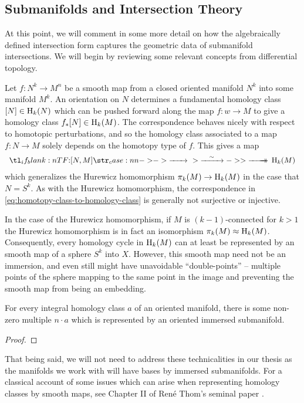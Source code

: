\subsection{Submanifolds and Intersection Theory}\label{sec:submanifolds-intersection-theory}

At this point, we will comment in some more detail on how the algebraically defined intersection form captures the geometric data of submanifold intersections. We will begin by reviewing some relevant concepts from differential topology.

Let $f : N^k\to M^n$ be a smooth map from a closed oriented manifold $N^k$ into some manifold $M^k$. An orientation on $N$ determines a fundamental homology class $[N]\in \operatorname{H}_k(N)$ which can be pushed forward along the map $f : w \to M$ to give a homology class $f_* [N]\in \operatorname{H}_k(M)$. 
The correspondence behaves nicely with respect to homotopic perturbations, and so
the homology class associated to a map $f : N \to M$ solely depends on the homotopy type of $f$. This gives a map
\begin{equation}\label{eq:homotopy-class-to-homology-class}
	\lkxfunc{}{[N,M]}{\H_k(M)}
\end{equation}
which generalizes the Hurewicz homomorphism $\pi_k(M) \to \operatorname{H}_k(M)$ in the case that $N=S^k$.
As with the Hurewicz homomorphism, the correspondence in \cref{eq:homotopy-class-to-homology-class} is generally not surjective or injective. 

In the case of the Hurewicz homomorphism, if $M$ is $(k-1)$-connected for $k > 1$ the Hurewicz homomorphism is in fact an isomorphism $\pi_{k}(M) \approx \operatorname{H}_{k}(M)$. Consequently, every homology cycle in $\operatorname{H}_{k}(M)$ can at least be represented by an smooth map of a sphere $S^{k}$ into $X$. However, this smooth map need not be an immersion, and even still might have unavoidable ``double-points'' -- multiple points of the sphere mapping to the same point in the image and preventing the smooth map from being an embedding.

\begin{theorem}[Thom]
	For every integral homology class $a$ of an oriented manifold, there is some non-zero multiple $n\cdot a$ which is represented by an oriented immersed submanifold.
\end{theorem}
\begin{proof}
\end{proof}

That being said, we will not need to address these technicalities in our thesis as the manifolds we work with will have bases by immersed submanifolds. For a classical account of some issues which can arise when representing homology classes by smooth maps, see Chapter II of Ren\'e Thom's seminal paper \cite{thom1954}.

